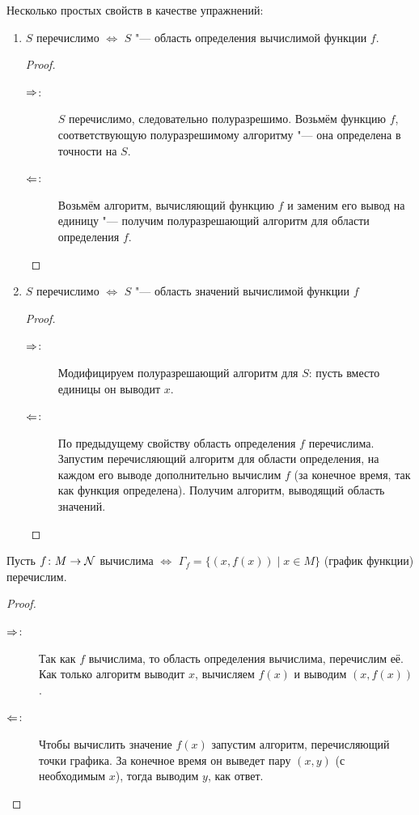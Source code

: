 Несколько простых свойств в качестве упражнений:
\begin{enumerate}
	\item
		$S$ перечислимо $\iff$ $S$ "--- область определения вычислимой функции $f$.
		\begin{proof}
			\begin{description}
				\item[$\Rightarrow$:]
					$S$ перечислимо, следовательно полуразрешимо.
					Возьмём функцию $f$, соответствующую полуразрешимому алгоритму "--- она определена в точности на $S$.
				\item[$\Leftarrow$:]
					Возьмём алгоритм, вычисляющий функцию $f$ и заменим его вывод на единицу "--- получим полуразрешающий алгоритм для области определения $f$.
			\end{description}
		\end{proof}
	\item
		$S$ перечислимо $\iff$ $S$ "--- область значений вычислимой функции $f$
		\begin{proof}
			\begin{description}
				\item[$\Rightarrow$:]
					Модифицируем полуразрешающий алгоритм для $S$: пусть вместо единицы он выводит $x$.
				\item[$\Leftarrow$:]
					По предыдущему свойству область определения $f$ перечислима.
					Запустим перечисляющий алгоритм для области определения, на каждом его выводе дополнительно вычислим $f$ (за конечное время, так как функция определена).
					Получим алгоритм, выводящий область значений.
			\end{description}
		\end{proof}
\end{enumerate}

\begin{theorem}
	Пусть $f \colon M \to \mathcal{N}$ вычислима $\iff$ $\Gamma_f = \{ (x, f(x)) \mid x \in M \}$ (график функции) перечислим.
\end{theorem}
\begin{proof}
	\begin{description}
		\item[$\Rightarrow$:]
			Так как $f$ вычислима, то область определения вычислима, перечислим её.
			Как только алгоритм выводит $x$, вычисляем $f(x)$ и выводим $(x, f(x))$.
		\item[$\Leftarrow$:]
			Чтобы вычислить значение $f(x)$ запустим алгоритм, перечисляющий точки графика.
			За конечное время он выведет пару $(x, y)$ (с необходимым $x$), тогда выводим $y$, как ответ.
	\end{description}
\end{proof}

